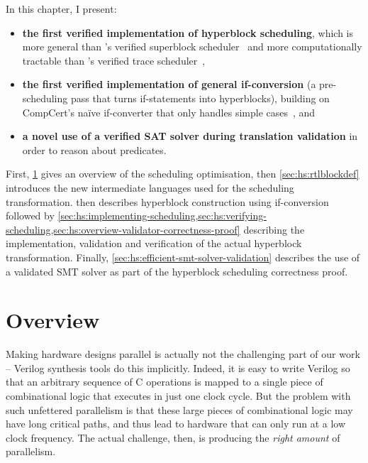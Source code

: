 In this chapter, I present:

\begin{itemize}
\item \textbf{the first verified implementation of hyperblock scheduling}, which
  is more general than \citeauthor{six22_formal_verif_super_sched}'s verified
  superblock scheduler~\cite{six22_formal_verif_super_sched} and more
  computationally tractable than
  \citeauthor{tristan08_formal_verif_trans_valid}'s verified trace
  scheduler~\cite{tristan08_formal_verif_trans_valid},
\item \textbf{the first verified implementation of general if-conversion} (a
  pre-scheduling pass that turns if-statements into hyperblocks), building on
  CompCert's na\"ive if-converter that only handles simple
  cases~\cite{absint19_compc}, and
\item \textbf{a novel use of a verified SAT solver during translation
    validation} in order to reason about predicates.
\end{itemize}

First, \cref{sec:hs:overview} gives an overview of the scheduling optimisation,
then \cref{sec:hs:rtlblockdef} introduces the new intermediate languages used
for the scheduling transformation.   then describes
hyperblock construction using if-conversion followed by
\cref{sec:hs:implementing-scheduling,sec:hs:verifying-scheduling,sec:hs:overview-validator-correctness-proof}
describing the implementation, validation and verification of the actual
hyperblock transformation.  Finally,
\cref{sec:hs:efficient-smt-solver-validation} describes the use of a validated
SMT solver as part of the hyperblock scheduling correctness proof.

\section{Overview}
\label{sec:hs:overview}

Making hardware designs parallel is actually not the challenging part of our work -- Verilog synthesis tools do this implicitly. Indeed, it is easy to write Verilog so that an arbitrary sequence of C operations is mapped to a single piece of combinational logic that executes in just one clock cycle. But the problem with such unfettered parallelism is that these large pieces of combinational logic may have long critical paths, and thus lead to hardware that can only run at a low clock frequency. The actual challenge, then, is producing the \emph{right amount} of parallelism.

